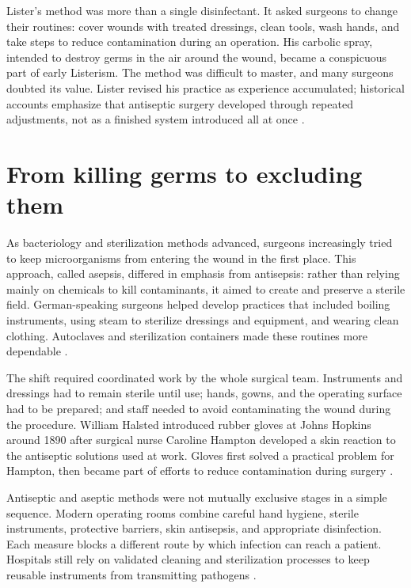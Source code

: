 \documentclass[12pt,oneside]{book}
\begin{document}
Lister's method was more than a single disinfectant. It asked surgeons to
change their routines: cover wounds with treated dressings, clean tools,
wash hands, and take steps to reduce contamination during an operation.
His carbolic spray, intended to destroy germs in the air around the wound,
became a conspicuous part of early Listerism. The method was difficult to
master, and many surgeons doubted its value. Lister revised his practice as
experience accumulated; historical accounts emphasize that antiseptic
surgery developed through repeated adjustments, not as a finished system
introduced all at once \cite{worboysLister,rcsLister}.

\section{From killing germs to excluding them}
As bacteriology and sterilization methods advanced, surgeons increasingly
tried to keep microorganisms from entering the wound in the first place.
This approach, called asepsis, differed in emphasis from antisepsis: rather
than relying mainly on chemicals to kill contaminants, it aimed to create
and preserve a sterile field. German-speaking surgeons helped develop
practices that included boiling instruments, using steam to sterilize
dressings and equipment, and wearing clean clothing. Autoclaves and
sterilization containers made these routines more dependable
\cite{asepsisSchlich}.

The shift required coordinated work by the whole surgical team. Instruments
and dressings had to remain sterile until use; hands, gowns, and the
operating surface had to be prepared; and staff needed to avoid contaminating
the wound during the procedure. William Halsted introduced rubber gloves at
Johns Hopkins around 1890 after surgical nurse Caroline Hampton developed a
skin reaction to the antiseptic solutions used at work. Gloves first solved
a practical problem for Hampton, then became part of efforts to reduce
contamination during surgery \cite{hopkinsGloves}.

Antiseptic and aseptic methods were not mutually exclusive stages in a
simple sequence. Modern operating rooms combine careful hand hygiene,
sterile instruments, protective barriers, skin antisepsis, and appropriate
disinfection. Each measure blocks a different route by which infection can
reach a patient. Hospitals still rely on validated cleaning and sterilization
processes to keep reusable instruments from transmitting pathogens
\cite{cdcSterilization}.
\end{document}
